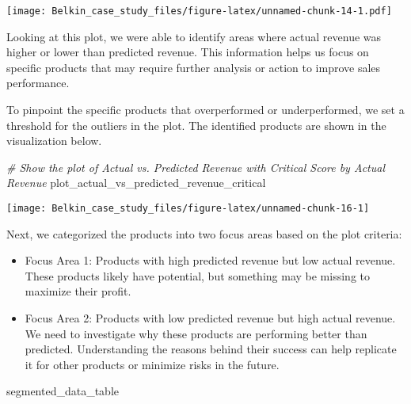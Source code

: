 \documentclass[
]{article}
\newenvironment{Shaded}{\begin{snugshade}}{\end{snugshade}}
\newcommand{\CommentTok}[1]{\textcolor[rgb]{0.56,0.35,0.01}{\textit{#1}}}
\newcommand{\NormalTok}[1]{#1}
\providecommand{\tightlist}{%
  \setlength{\itemsep}{0pt}\setlength{\parskip}{0pt}}
\begin{document}
\texttt{[image: Belkin\_case\_study\_files/figure-latex/unnamed-chunk-14-1.pdf]}

Looking at this plot, we were able to identify areas where actual
revenue was higher or lower than predicted revenue. This information
helps us focus on specific products that may require further analysis or
action to improve sales performance.

To pinpoint the specific products that overperformed or underperformed,
we set a threshold for the outliers in the plot. The identified products
are shown in the visualization below.

\begin{Shaded}
\begin{Highlighting}[]
\CommentTok{\# Show the plot of Actual vs. Predicted Revenue with Critical Score by Actual Revenue}
\NormalTok{plot\_actual\_vs\_predicted\_revenue\_critical}
\end{Highlighting}
\end{Shaded}

\begin{center}\texttt{[image: Belkin\_case\_study\_files/figure-latex/unnamed-chunk-16-1]} \end{center}

Next, we categorized the products into two focus areas based on the plot
criteria:

\begin{itemize}
\tightlist
\item
  Focus Area 1: Products with high predicted revenue but low actual
  revenue. These products likely have potential, but something may be
  missing to maximize their profit.
\item
  Focus Area 2: Products with low predicted revenue but high actual
  revenue. We need to investigate why these products are performing
  better than predicted. Understanding the reasons behind their success
  can help replicate it for other products or minimize risks in the
  future.
\end{itemize}

\begin{Shaded}
\begin{Highlighting}[]
\NormalTok{segmented\_data\_table}
\end{Highlighting}
\end{Shaded}
\end{document}

